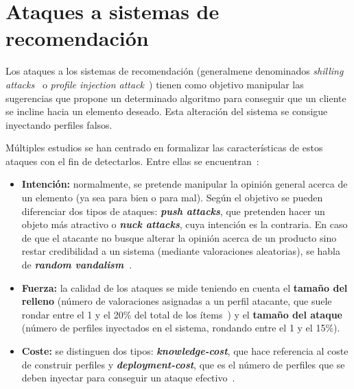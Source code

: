 \section{Ataques a sistemas de recomendación}

Los ataques a los sistemas de recomendación (generalmene denominados \textit{shilling attacks}~\cite{mingdan2018ShillingAttacksAReview} o \textit{profile injection attack}~\cite{Mobasher2006Thesis}) tienen como objetivo manipular las sugerencias que propone un determinado algoritmo para conseguir que un cliente se incline hacia un elemento deseado. Esta alteración del sistema se consigue inyectando perfiles falsos.

Múltiples estudios se han centrado en formalizar las características de estos ataques con el fin de detectarlos. Entre ellas se encuentran~\cite{mingdan2018ShillingAttacksAReview}:

\begin{itemize}
	
	\item \textbf{Intención:} normalmente, se pretende manipular la opinión general acerca de un elemento (ya sea para bien o para mal). Según el objetivo se pueden diferenciar dos tipos de ataques: \textbf{\textit{push attacks}}, que pretenden hacer un objeto más atractivo o \textbf{\textit{nuck attacks}}, cuya intención es la contraria. En caso de que el atacante no busque alterar la opinión acerca de un producto sino restar credibilidad a un sistema (mediante valoraciones aleatorias), se habla de \textbf{\textit{random vandalism}~\cite{Burke2015RobustCollaborative}}.
	
	\item \textbf{Fuerza:} la calidad de los ataques se mide teniendo en cuenta el \textbf{tamaño del relleno} (número de valoraciones asignadas a un perfil atacante, que suele rondar entre el 1 y el 20\% del total de los ítems~\cite{mingdan2018ShillingAttacksAReview}) y el \textbf{tamaño del ataque} (número de perfiles inyectados en el sistema, rondando entre el 1 y el 15\%).
	
	\item \textbf{Coste:} se distinguen dos tipos: \textbf{\textit{knowledge-cost}}, que hace referencia al coste de construir perfiles y \textbf{\textit{deployment-cost}}, que es el número de perfiles que se deben inyectar para conseguir un ataque efectivo~\cite{Mobasher2006Thesis}.
	
\end{itemize}

